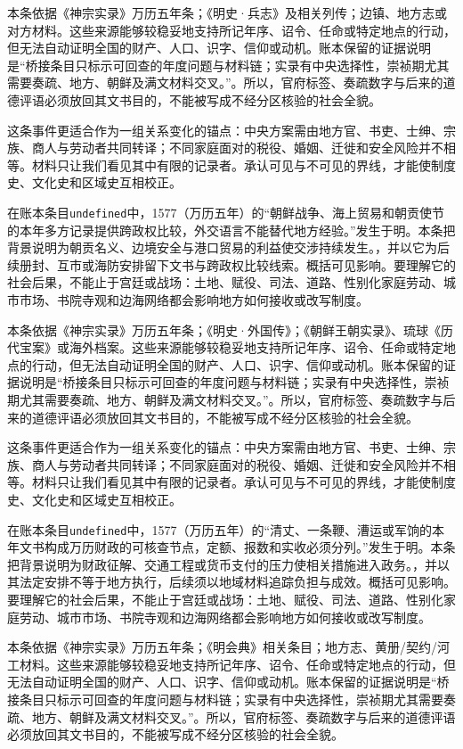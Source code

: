 本条依据《神宗实录》万历五年条；《明史·兵志》及相关列传；边镇、地方志或对方材料。这些来源能够较稳妥地支持所记年序、诏令、任命或特定地点的行动，但无法自动证明全国的财产、人口、识字、信仰或动机。账本保留的证据说明是“桥接条目只标示可回查的年度问题与材料链；实录有中央选择性，崇祯期尤其需要奏疏、地方、朝鲜及满文材料交叉。”。所以，官府标签、奏疏数字与后来的道德评语必须放回其文书目的，不能被写成不经分区核验的社会全貌。

这条事件更适合作为一组关系变化的锚点：中央方案需由地方官、书吏、士绅、宗族、商人与劳动者共同转译；不同家庭面对的税役、婚姻、迁徙和安全风险并不相等。材料只让我们看见其中有限的记录者。承认可见与不可见的界线，才能使制度史、文化史和区域史互相校正。

在账本条目\texttt{undefined}中，1577（万历五年）的“朝鲜战争、海上贸易和朝贡使节的本年多方记录提供跨政权比较，外交语言不能替代地方经验。”发生于明。本条把背景说明为朝贡名义、边境安全与港口贸易的利益使交涉持续发生。，并以它为后续册封、互市或海防安排留下文书与跨政权比较线索。概括可见影响。要理解它的社会后果，不能止于宫廷或战场：土地、赋役、司法、道路、性别化家庭劳动、城市市场、书院寺观和边海网络都会影响地方如何接收或改写制度。

本条依据《神宗实录》万历五年条；《明史·外国传》；《朝鲜王朝实录》、琉球《历代宝案》或海外档案。这些来源能够较稳妥地支持所记年序、诏令、任命或特定地点的行动，但无法自动证明全国的财产、人口、识字、信仰或动机。账本保留的证据说明是“桥接条目只标示可回查的年度问题与材料链；实录有中央选择性，崇祯期尤其需要奏疏、地方、朝鲜及满文材料交叉。”。所以，官府标签、奏疏数字与后来的道德评语必须放回其文书目的，不能被写成不经分区核验的社会全貌。

这条事件更适合作为一组关系变化的锚点：中央方案需由地方官、书吏、士绅、宗族、商人与劳动者共同转译；不同家庭面对的税役、婚姻、迁徙和安全风险并不相等。材料只让我们看见其中有限的记录者。承认可见与不可见的界线，才能使制度史、文化史和区域史互相校正。

在账本条目\texttt{undefined}中，1577（万历五年）的“清丈、一条鞭、漕运或军饷的本年文书构成万历财政的可核查节点，定额、报数和实收必须分列。”发生于明。本条把背景说明为财政征解、交通工程或货币支付的压力使相关措施进入政务。，并以其法定安排不等于地方执行，后续须以地域材料追踪负担与成效。概括可见影响。要理解它的社会后果，不能止于宫廷或战场：土地、赋役、司法、道路、性别化家庭劳动、城市市场、书院寺观和边海网络都会影响地方如何接收或改写制度。

本条依据《神宗实录》万历五年条；《明会典》相关条目；地方志、黄册/契约/河工材料。这些来源能够较稳妥地支持所记年序、诏令、任命或特定地点的行动，但无法自动证明全国的财产、人口、识字、信仰或动机。账本保留的证据说明是“桥接条目只标示可回查的年度问题与材料链；实录有中央选择性，崇祯期尤其需要奏疏、地方、朝鲜及满文材料交叉。”。所以，官府标签、奏疏数字与后来的道德评语必须放回其文书目的，不能被写成不经分区核验的社会全貌。

